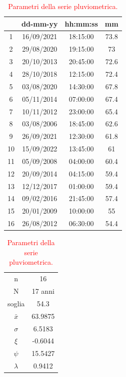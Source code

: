 \begin{table}[H]
    \begin{minipage}{.5\linewidth}
      \caption{\textcolor{red}{Campione della serie pluviometrica.}}
      \centering
        \begin{tabular}{cccc}
            \toprule
            & dd-mm-yy   & hh:mm:ss & mm \\
         \midrule
         1  & 16/09/2021 & 18:15:00 & 73.8 \\
         2  & 29/08/2020 & 19:15:00 & 73   \\
         3  & 20/10/2013 & 20:45:00 & 72.6 \\
         4  & 28/10/2018 & 12:15:00 & 72.4 \\
         5  & 03/08/2020 & 14:30:00 & 67.8 \\
         6  & 05/11/2014 & 07:00:00 & 67.4 \\
         7  & 10/11/2012 & 23:00:00 & 65.4 \\
         8  & 03/08/2006 & 18:45:00 & 62.6 \\
         9  & 26/09/2021 & 12:30:00 & 61.8 \\
         10 & 15/09/2022 & 13:45:00 & 61   \\
         11 & 05/09/2008 & 04:00:00 & 60.4 \\
         12 & 20/09/2014 & 04:15:00 & 59.4 \\
         13 & 12/12/2017 & 01:00:00 & 59.4 \\
         14 & 09/02/2016 & 21:45:00 & 57.4 \\
         15 & 20/01/2009 & 10:00:00 & 55   \\
         16 & 26/08/2012 & 06:30:00 & 54.4 \\
         \bottomrule
        \end{tabular}
    \end{minipage}%
    \begin{minipage}{.5\linewidth}
      \centering
        \caption{\textcolor{red}{Parametri della serie pluviometrica.}}
        \begin{tabular}{cc}
            \toprule
            n        &    16     \\
            N        & 17 anni \\
            soglia   &     54.3    \\
            $\bar{x}$ &  63.9875\\
            $\sigma$ &   6.5183  \\
            $\xi$    &    -0.6044  \\
            $\psi$      &    15.5427 \\
            $\lambda$   &    0.9412\\
        \bottomrule     
        \end{tabular}
    \end{minipage} 
\end{table}

